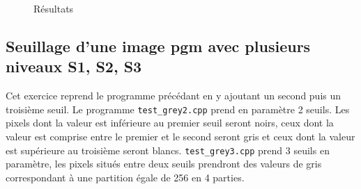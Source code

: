 \documentclass[11pt]{article}
\begin{document}
\begin{figure}[!htb]
  \centering
  \caption{Résultats}
\end{figure}

\FloatBarrier

\clearpage
\subsection{Seuillage d’une image pgm avec plusieurs niveaux S1, S2, S3}
Cet exercice reprend le programme précédant en y ajoutant un second puis un troisième seuil. Le programme \texttt{test\_grey2.cpp} prend en paramètre 2 seuils. Les pixels dont la valeur est inférieure au premier seuil seront noirs, ceux dont la valeur est comprise entre le premier et le second seront gris et ceux dont la valeur est supérieure au troisième seront blancs. \texttt{test\_grey3.cpp} prend 3 seuils en paramètre, les pixels situés entre deux seuils prendront des valeurs de gris correspondant à une partition égale de 256 en 4 parties.
\end{document}
